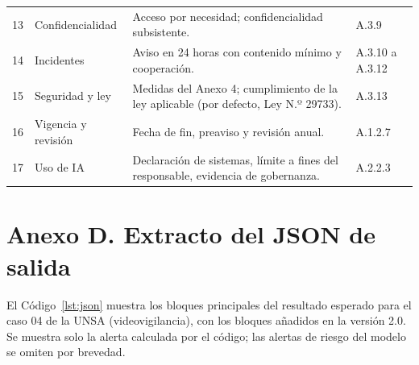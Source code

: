 \documentclass[12pt,letterpaper]{article}
\begin{document}
\begin{table}[H]
\begin{tabularx}{\linewidth}{@{}c L{3.4cm} Y L{2.0cm}@{}}
13 & Confidencialidad & Acceso por necesidad; confidencialidad subsistente. & A.3.9 \\
14 & Incidentes & Aviso en 24 horas con contenido mínimo y cooperación. & A.3.10 a A.3.12 \\
15 & Seguridad y ley & Medidas del Anexo 4; cumplimiento de la ley aplicable (por defecto, Ley N.º 29733). & A.3.13 \\
16 & Vigencia y revisión & Fecha de fin, preaviso y revisión anual. & A.1.2.7 \\
17 & Uso de IA & Declaración de sistemas, límite a fines del responsable, evidencia de gobernanza. & A.2.2.3 \\
\bottomrule
\end{tabularx}
\end{table}

\newpage
\section{Anexo D. Extracto del JSON de salida}
\label{anx:json}

El Código~\ref{lst:json} muestra los bloques principales del resultado esperado para el caso 04 de la UNSA (videovigilancia), con los bloques añadidos en la versión 2.0. Se muestra solo la alerta calculada por el código; las alertas de riesgo del modelo se omiten por brevedad.
\end{document}
